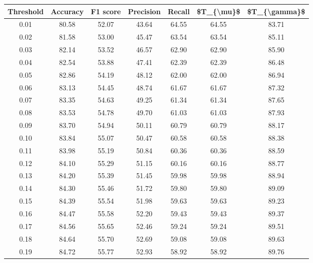 \begin{tabular}{|c|c|c|c|c|c|c|}
\hline
 Threshold &  Accuracy &  F1 score &  Precision &  Recall &  \$T\_\{\textbackslash mu\}\$ &  \$T\_\{\textbackslash gamma\}\$ \\
\hline
      0.01 &     80.58 &     52.07 &      43.64 &   64.55 &      64.55 &         83.71 \\
      0.02 &     81.58 &     53.00 &      45.47 &   63.54 &      63.54 &         85.11 \\
      0.03 &     82.14 &     53.52 &      46.57 &   62.90 &      62.90 &         85.90 \\
      0.04 &     82.54 &     53.88 &      47.41 &   62.39 &      62.39 &         86.48 \\
      0.05 &     82.86 &     54.19 &      48.12 &   62.00 &      62.00 &         86.94 \\
      0.06 &     83.13 &     54.45 &      48.74 &   61.67 &      61.67 &         87.32 \\
      0.07 &     83.35 &     54.63 &      49.25 &   61.34 &      61.34 &         87.65 \\
      0.08 &     83.53 &     54.78 &      49.70 &   61.03 &      61.03 &         87.93 \\
      0.09 &     83.70 &     54.94 &      50.11 &   60.79 &      60.79 &         88.17 \\
      0.10 &     83.84 &     55.07 &      50.47 &   60.58 &      60.58 &         88.38 \\
      0.11 &     83.98 &     55.19 &      50.84 &   60.36 &      60.36 &         88.59 \\
      0.12 &     84.10 &     55.29 &      51.15 &   60.16 &      60.16 &         88.77 \\
      0.13 &     84.20 &     55.39 &      51.45 &   59.98 &      59.98 &         88.94 \\
      0.14 &     84.30 &     55.46 &      51.72 &   59.80 &      59.80 &         89.09 \\
      0.15 &     84.39 &     55.54 &      51.98 &   59.63 &      59.63 &         89.23 \\
      0.16 &     84.47 &     55.58 &      52.20 &   59.43 &      59.43 &         89.37 \\
      0.17 &     84.56 &     55.65 &      52.46 &   59.24 &      59.24 &         89.51 \\
      0.18 &     84.64 &     55.70 &      52.69 &   59.08 &      59.08 &         89.63 \\
      0.19 &     84.72 &     55.77 &      52.93 &   58.92 &      58.92 &         89.76 \\

\end{tabular}
